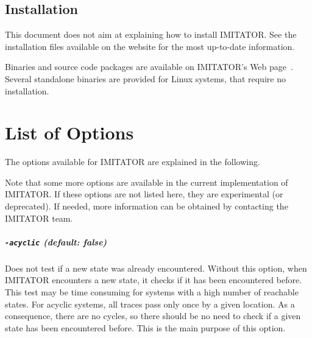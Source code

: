 \documentclass[a4paper,11pt]{report}
\newcommand{\imitator}{\textsf{IMITATOR}}
\newcommand{\styleOption}[1]{\textcolor{optioncolor}{\texttt{#1}}}
\begin{document}
\section{Installation}

This document does not aim at explaining how to install \imitator{}.
See the installation files available on the website for the most up-to-date information.

Binaries and source code packages are available on \imitator{}'s Web page~\cite{imitator}.
Several standalone binaries are provided for Linux systems, that require no installation.



\chapter{List of Options}\label{chapter:options}

The options available for \imitator{} are explained in the following.

Note that some more options are available in the current implementation of \imitator{}.
If these options are not listed here, they are experimental (or deprecated).
If needed, more information can be obtained by contacting the \imitator{} team.


\paragraph{\styleOption{-acyclic} (default: false)}
Does not test if a new state was already encountered.
Without this option, when \imitator{} encounters a new state, it checks if it has been encountered before.
This test may be time consuming for systems with a high number of reachable states.
For acyclic systems, all traces pass only once by a given location.
As a consequence, there are no cycles, so there should be no need to check if a given state has been encountered before.
This is the main purpose of this option.
\end{document}
